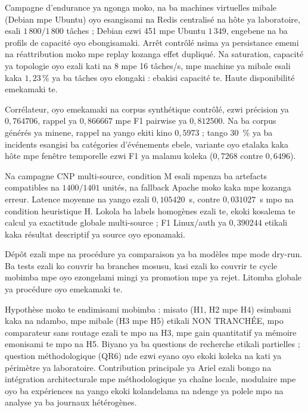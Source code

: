 Campagne d'endurance ya ngonga moko, na ba machines virtuelles mibale
(Debian mpe Ubuntu) oyo esangisami na Redis centralisé na hôte ya
laboratoire, esali $1\,800/1\,800$ tâches ; Debian ezwi 451 mpe Ubuntu
$1\,349$, engebene na ba profils de capacité oyo ebongisamaki. Arrêt
contrôlé nsima ya persistance ememi na réattribution moko mpe replay
kozanga effet dupliqué. Na saturation, capacité ya topologie oyo ezali
kati na 8 mpe 16 tâches/s, mpe machine ya mibale esali kaka
$1{,}23\,\%$ ya ba tâches oyo elongaki : ebakisi capacité te. Haute
disponibilité emekamaki te.

Corrélateur, oyo emekamaki na corpus synthétique contrôlé, ezwi précision
ya $0{,}764706$, rappel ya $0{,}866667$ mpe F1 pairwise ya
$0{,}812500$. Na ba corpus générés ya minene, rappel na yango ekiti kino
$0{,}5973$ ; tango 30~\% ya ba incidents esangisi ba catégories
d'événements ebele, variante oyo etalaka kaka hôte mpe fenêtre temporelle
ezwi F1 ya malamu koleka ($0{,}7268$ contre $0{,}6496$).

Na campagne CNP multi-source, condition M esali mpenza ba
artefacts compatibles na $1400/1401$ unités, na fallback Apache moko
kaka mpe kozanga erreur. Latence moyenne na yango ezali
$0{,}105420$~s, contre $0{,}031027$~s mpo na condition heuristique H.
Lokola ba labels homogènes ezali te, ekoki kosalema te calcul ya
exactitude globale multi-source ; F1 Linux/auth ya $0{,}390244$ etikali
kaka résultat descriptif ya source oyo eponamaki.

Dépôt ezali mpe na procédure ya comparaison ya ba modèles mpe mode
dry-run. Ba tests ezali ko couvrir ba branches mosusu, kasi ezali ko
couvrir te cycle mobimba mpe oyo ezongelami mingi ya promotion mpe ya
rejet. Litomba globale ya procédure oyo emekamaki te.

Hypothèse moko te endimisami mobimba : misato (H1, H2 mpe H4) esimbami
kaka na ndambo, mpe mibale (H3 mpe H5) etikali NON TRANCHÉE, mpo
comparateur sans routage ezali te mpo na H3, mpe gain quantitatif ya
mémoire emonisami te mpo na H5. Biyano ya ba questions de recherche
etikali partielles ; question méthodologique (QR6) nde ezwi eyano oyo
ekoki koleka na kati ya périmètre ya laboratoire.
Contribution principale ya Ariel \logminer{} ezali bongo na intégration
architecturale mpe méthodologique ya chaîne locale, modulaire
mpe oyo ba expériences na yango ekoki kolandelama na ndenge ya polele
mpo na analyse ya ba journaux hétérogènes.
